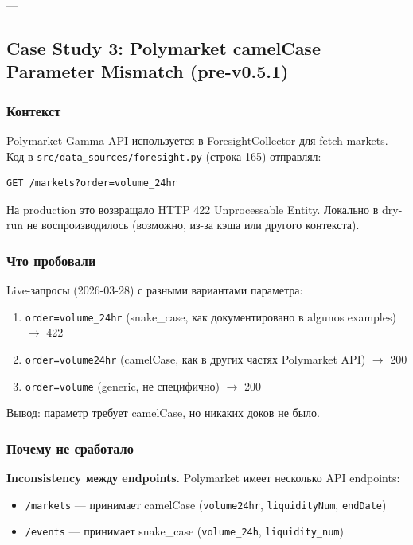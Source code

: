 ---

\subsection{Case Study 3: Polymarket camelCase Parameter Mismatch (pre-v0.5.1)}

\subsubsection*{Контекст}
Polymarket Gamma API используется в ForesightCollector для fetch markets. Код в \texttt{src/data\_sources/foresight.py} (строка 165) отправлял:
\begin{verbatim}
GET /markets?order=volume_24hr
\end{verbatim}

На production это возвращало HTTP 422 Unprocessable Entity. Локально в dry-run не воспроизводилось (возможно, из-за кэша или другого контекста).

\subsubsection*{Что пробовали}
Live-запросы (2026-03-28) с разными вариантами параметра:
\begin{enumerate}
\item \texttt{order=volume\_24hr} (snake\_case, как документировано в algunos examples) $\to$ 422
\item \texttt{order=volume24hr} (camelCase, как в других частях Polymarket API) $\to$ 200
\item \texttt{order=volume} (generic, не специфично) $\to$ 200
\end{enumerate}

Вывод: параметр требует camelCase, но никаких доков не было.

\subsubsection*{Почему не сработало}
\textbf{Inconsistency между endpoints.} Polymarket имеет несколько API endpoints:
\begin{itemize}
\item \texttt{/markets} --- принимает camelCase (\texttt{volume24hr}, \texttt{liquidityNum}, \texttt{endDate})
\item \texttt{/events} --- принимает snake\_case (\texttt{volume\_24h}, \texttt{liquidity\_num})
\end{itemize}

